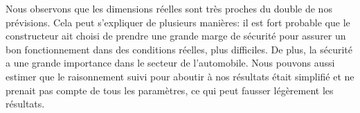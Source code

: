 \documentclass[a4paper,oneside,11pt]{report}
\begin{document}
Nous observons que les dimensions réelles sont très proches du double de nos prévisions. Cela peut s'expliquer de plusieurs manières: il est fort probable que le constructeur ait choisi de prendre une grande marge de sécurité pour assurer un bon fonctionnement dans des conditions réelles, plus difficiles. De plus, la sécurité a une grande importance dans le secteur de l'automobile. Nous pouvons aussi estimer que le raisonnement suivi pour aboutir à nos résultats était simplifié et ne prenait pas compte de tous les paramètres, ce qui peut fausser légèrement les résultats.


\end{document}
